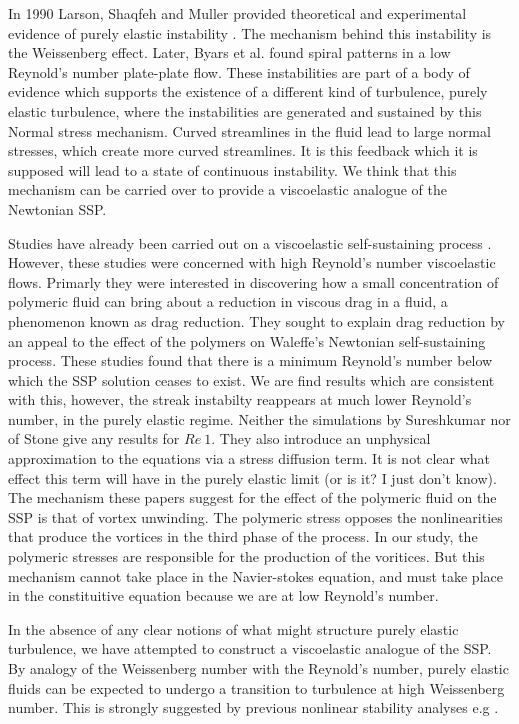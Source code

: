 \documentclass{jfm}
\begin{document}
In 1990 Larson, Shaqfeh and Muller provided theoretical and experimental evidence of purely elastic instability \cite{Larson1990}. The mechanism behind this instability is the Weissenberg effect\cite{WeissenbergLONGLONGAGO}. Later, Byars et al. \cite{ByarsWHENEVER} found spiral patterns in a low Reynold's number plate-plate flow. These instabilities are part of a body of evidence which supports the existence of a different kind of turbulence, purely elastic turbulence, where the instabilities are generated and sustained by this Normal stress mechanism. Curved streamlines in the fluid lead to large normal stresses, which create more curved streamlines. It is this feedback which it is supposed will lead to a state of continuous instability. We think that this mechanism can be carried over to provide a viscoelastic analogue of the Newtonian SSP.

Studies have already been carried out on a viscoelastic self-sustaining process \cite{Stone2004, Stone2002, Sureshkumar1997}. However, these studies were concerned with high Reynold's number viscoelastic flows. Primarly they were interested in discovering how a small concentration of polymeric fluid can bring about a reduction in viscous drag in a fluid, a phenomenon known as drag reduction. They sought to explain drag reduction by an appeal to the effect of the polymers on Waleffe's Newtonian self-sustaining process. These studies found that there is a minimum Reynold's number below which the SSP solution ceases to exist. We are find results which are consistent with this, however, the streak instabilty reappears at much lower Reynold's number, in the purely elastic regime. Neither the simulations by Sureshkumar \cite{Sureshkumar1997} nor of Stone \cite{Stone2004} give any results for $Re~1$. They also introduce an unphysical approximation to the equations via a stress diffusion term. It is not clear what effect this term will have in the purely elastic limit (or is it? I just don't know). The mechanism these papers suggest for the effect of the polymeric fluid on the SSP is that of vortex unwinding. The polymeric stress opposes the nonlinearities that produce the vortices in the third phase of the process. In our study, the polymeric stresses are responsible for the production of the voritices. But this mechanism cannot take place in the Navier-stokes equation, and must take place in the constituitive equation because we are at low Reynold's number.

In the absence of any clear notions of what might structure purely elastic turbulence, we have attempted to construct a viscoelastic analogue of the SSP. By analogy of the Weissenberg number with the Reynold's number, purely elastic fluids can be expected to undergo a transition to turbulence at high Weissenberg number. This is strongly suggested by previous nonlinear stability analyses e.g \cite{MorozovNONLINEARANALYSIS}. 
\end{document}
